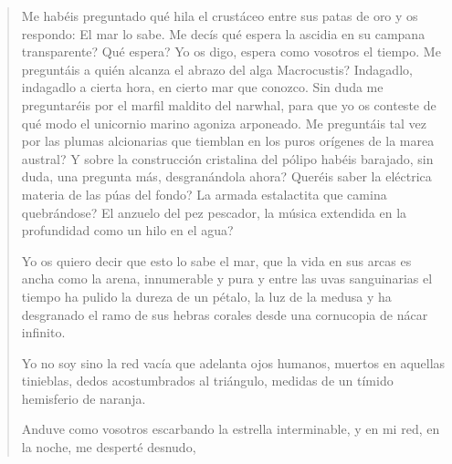 \documentclass[12pt]{article}
\begin{document}
\clearpage
{}
\begin{verse}
Me habéis preguntado qué hila el crustáceo entre sus patas de oro  
y os respondo: El mar lo sabe.  
Me decís qué espera la ascidia en su campana transparente? Qué espera?  
Yo os digo, espera como vosotros el tiempo.  
Me preguntáis a quién alcanza el abrazo del alga Macrocustis?  
Indagadlo, indagadlo a cierta hora, en cierto mar que conozco.  
Sin duda me preguntaréis por el marfil maldito del narwhal, para que yo os conteste  
de qué modo el unicornio marino agoniza arponeado.  
Me preguntáis tal vez por las plumas alcionarias que tiemblan  
en los puros orígenes de la marea austral?  
Y sobre la construcción cristalina del pólipo habéis barajado, sin duda,  
una pregunta más, desgranándola ahora?  
Queréis saber la eléctrica materia de las púas del fondo?  
La armada estalactita que camina quebrándose?  
El anzuelo del pez pescador, la música extendida  
en la profundidad como un hilo en el agua?  
	
Yo os quiero decir que esto lo sabe el mar, que la vida en sus arcas  
es ancha como la arena, innumerable y pura  
y entre las uvas sanguinarias el tiempo ha pulido  
la dureza de un pétalo, la luz de la medusa  
y ha desgranado el ramo de sus hebras corales  
desde una cornucopia de nácar infinito.  
	
Yo no soy sino la red vacía que adelanta  
ojos humanos, muertos en aquellas tinieblas,  
dedos acostumbrados al triángulo, medidas  
de un tímido hemisferio de naranja.  
	
Anduve como vosotros escarbando  
la estrella interminable,  
y en mi red, en la noche, me desperté desnudo,  

\end{verse}
\end{document}
